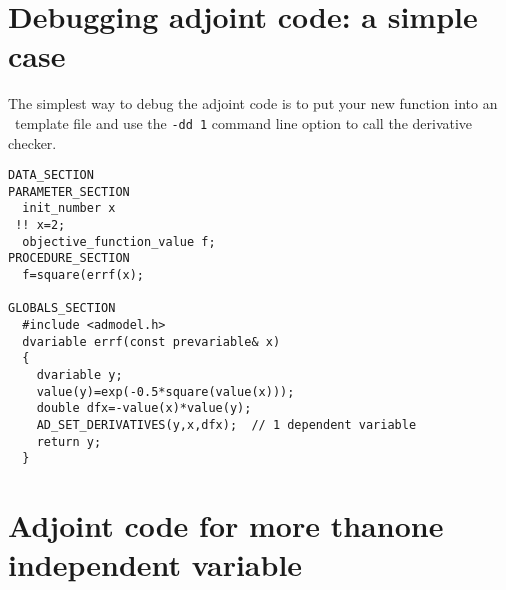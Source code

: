 \section{Debugging adjoint code: a simple case}

The simplest way to debug the adjoint code is to put your new
function into an \ADM\ template file and use the \texttt{-dd 1}
command line option to call the derivative checker.
\begin{lstlisting}
DATA_SECTION
PARAMETER_SECTION
  init_number x
 !! x=2;
  objective_function_value f;
PROCEDURE_SECTION
  f=square(errf(x);
  
GLOBALS_SECTION
  #include <admodel.h>
  dvariable errf(const prevariable& x)
  {
    dvariable y;
    value(y)=exp(-0.5*square(value(x)));
    double dfx=-value(x)*value(y);
    AD_SET_DERIVATIVES(y,x,dfx);  // 1 dependent variable 
    return y;
  }
\end{lstlisting}


\section{Adjoint code for more than\br one independent variable}

